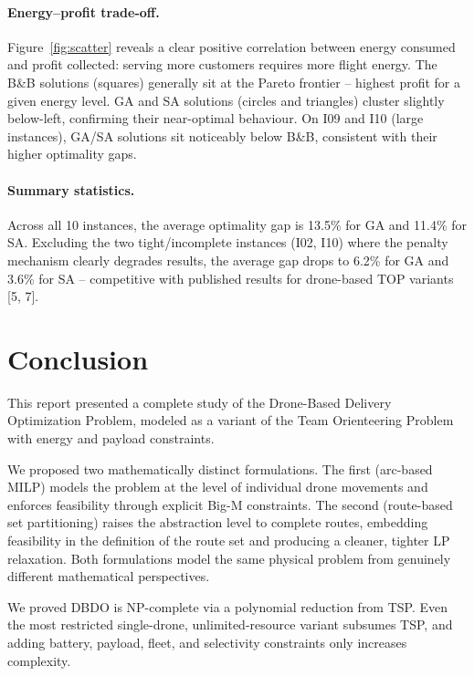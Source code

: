 \documentclass[12pt,a4paper]{article}
\begin{document}
\paragraph{Energy--profit trade-off.}
Figure~\ref{fig:scatter} reveals a clear positive correlation between energy consumed
and profit collected: serving more customers requires more flight energy. The B\&B
solutions (squares) generally sit at the Pareto frontier -- highest profit for a given
energy level. GA and SA solutions (circles and triangles) cluster slightly below-left,
confirming their near-optimal behaviour. On I09 and I10 (large instances), GA/SA
solutions sit noticeably below B\&B, consistent with their higher optimality gaps.

\paragraph{Summary statistics.}
Across all 10 instances, the average optimality gap is 13.5\% for GA and 11.4\% for SA.
Excluding the two tight/incomplete instances (I02, I10) where the penalty mechanism
clearly degrades results, the average gap drops to 6.2\% for GA and 3.6\% for SA --
competitive with published results for drone-based TOP variants [5, 7].

\section{Conclusion}

This report presented a complete study of the Drone-Based Delivery Optimization Problem,
modeled as a variant of the Team Orienteering Problem with energy and payload constraints.

We proposed two mathematically distinct formulations. The first (arc-based MILP) models
the problem at the level of individual drone movements and enforces feasibility through
explicit Big-M constraints. The second (route-based set partitioning) raises the
abstraction level to complete routes, embedding feasibility in the definition of the
route set and producing a cleaner, tighter LP relaxation. Both formulations model the
same physical problem from genuinely different mathematical perspectives.

We proved DBDO is NP-complete via a polynomial reduction from TSP. Even the most
restricted single-drone, unlimited-resource variant subsumes TSP, and adding battery,
payload, fleet, and selectivity constraints only increases complexity.
\end{document}

